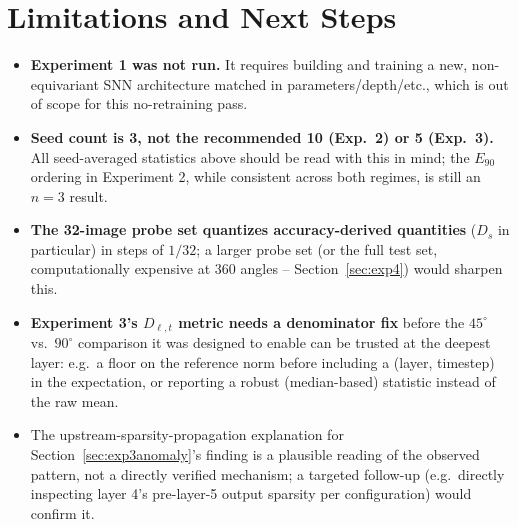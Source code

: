 \documentclass[11pt]{article}
\begin{document}
\section{Limitations and Next Steps}
\label{sec:limitations}

\begin{itemize}[leftmargin=1.5em]
\item \textbf{Experiment 1 was not run.} It requires building and training a new, non-equivariant SNN
architecture matched in parameters/depth/etc., which is out of scope for this no-retraining pass.
\item \textbf{Seed count is 3, not the recommended 10 (Exp.\ 2) or 5 (Exp.\ 3).} All seed-averaged
statistics above should be read with this in mind; the $E_{90}$ ordering in Experiment 2, while
consistent across both regimes, is still an $n=3$ result.
\item \textbf{The 32-image probe set quantizes accuracy-derived quantities} ($D_s$ in particular) in
steps of $1/32$; a larger probe set (or the full test set, computationally expensive at 360 angles --
Section~\ref{sec:exp4}) would sharpen this.
\item \textbf{Experiment 3's $D_{\ell,t}$ metric needs a denominator fix} before the $45^\circ$ vs.\
$90^\circ$ comparison it was designed to enable can be trusted at the deepest layer: e.g.\ a floor on
the reference norm before including a (layer, timestep) in the expectation, or reporting a robust
(median-based) statistic instead of the raw mean.
\item The upstream-sparsity-propagation explanation for Section~\ref{sec:exp3anomaly}'s finding is a
plausible reading of the observed pattern, not a directly verified mechanism; a targeted follow-up
(e.g.\ directly inspecting layer 4's pre-layer-5 output sparsity per configuration) would confirm it.
\end{itemize}
\end{document}
